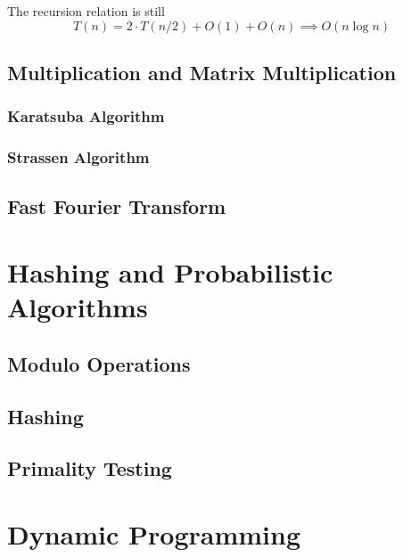 \documentclass{article}
\begin{document}
\begin{algo}
\begin{algorithm}[H]
\begin{algorithmic}
            \State {}
          \EndFunction
        \end{algorithmic}
      \end{algorithm}
      The recursion relation is still 
      \begin{equation}
        T(n) = 2 \cdot T(n/2) + O(1) + O(n) \implies O(n \log{n})
      \end{equation}
    \end{algo}

  \subsection{Multiplication and Matrix Multiplication} 

    \subsubsection{Karatsuba Algorithm}


    \subsubsection{Strassen Algorithm}


  \subsection{Fast Fourier Transform}

\section{Hashing and Probabilistic Algorithms}

  \subsection{Modulo Operations}
  
  \subsection{Hashing}

  \subsection{Primality Testing}

\section{Dynamic Programming}
\end{document}
